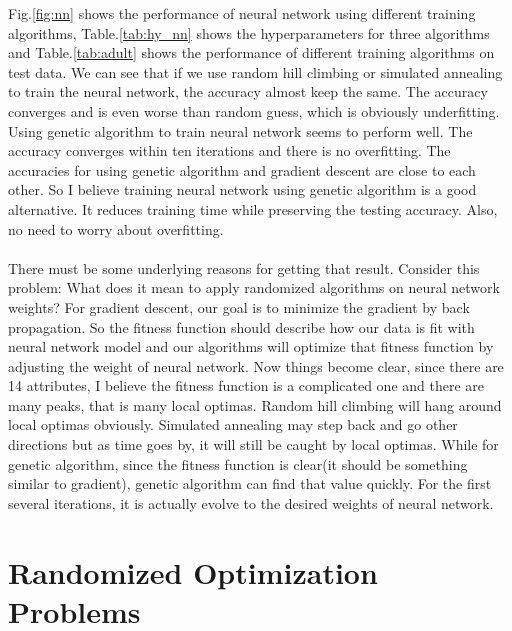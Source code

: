 \documentclass[11pt]{article}
\begin{document}
Fig.\ref{fig:nn} shows the performance of neural network using different training algorithms, Table.\ref{tab:hy_nn} shows the hyperparameters for three algorithms and Table.\ref{tab:adult} shows the performance of different training algorithms on test data. We can see that if we use random hill climbing or simulated annealing to train the neural network, the accuracy almost keep the same. The accuracy converges and is even worse than random guess, which is obviously underfitting. Using genetic algorithm to train neural network seems to perform well. The accuracy converges within ten iterations and there is no overfitting. The accuracies for using genetic algorithm and gradient descent are close to each other. So I believe training neural network using genetic algorithm is a good alternative. It reduces training time while preserving the testing accuracy. Also, no need to worry about overfitting.\\
\\
There must be some underlying reasons for getting that result. Consider this problem: What does it mean to apply randomized algorithms on neural network weights? For gradient descent, our goal is to minimize the gradient by back propagation. So the fitness function should describe how our data is fit with neural network model and our algorithms will optimize that fitness function by adjusting the weight of neural network. Now things become clear, since there are 14 attributes, I believe the fitness function is a complicated one and there are many peaks, that is many local optimas. Random hill climbing will hang around local optimas obviously. Simulated annealing may step back and go other directions but as time goes by, it will still be caught by local optimas. While for genetic algorithm, since the fitness function is clear(it should be something similar to gradient), genetic algorithm can find that value quickly. For the first several iterations, it is actually evolve to the desired weights of neural network.

\section{Randomized Optimization Problems}
\end{document}

